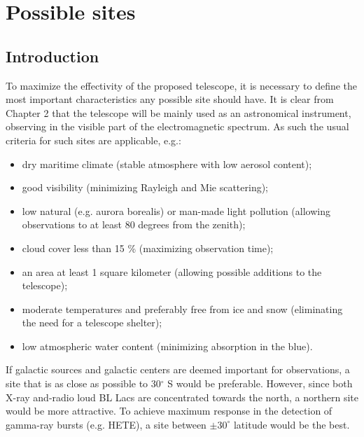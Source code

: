\chapter{Possible sites}


\section{Introduction}

\par\medskip
To maximize the effectivity of the proposed telescope, it is
necessary to define the most important characteristics any possible site
should have. It is clear from Chapter 2 that the telescope will be mainly
used as an astronomical instrument, observing in the visible part of the
electromagnetic spectrum. As such the usual criteria for such sites are
applicable, e.g.:

\begin{itemize}
\item  dry maritime climate (stable atmosphere with low aerosol content);

\item  good visibility (minimizing Rayleigh and Mie scattering);

\item  low natural (e.g. aurora borealis) or man-made light pollution
(allowing observations to at least 80 degrees from the zenith);

\item  cloud cover less than 15 \% (maximizing observation time);

\item  an area at least 1 square kilometer (allowing possible additions to
the telescope);

\item  moderate temperatures and preferably free from ice and snow
(eliminating the need for a telescope shelter);

\item  low atmospheric water content (minimizing absorption in the blue).
\end{itemize}

If galactic sources and galactic centers are deemed important for
observations, a site that is as close as possible to 30$^\circ$ S would be
preferable. However, since both X-ray and-radio loud BL Lacs are
concentrated towards the north, a northern site would be more attractive. To
achieve maximum response in the detection of gamma-ray bursts (e.g. HETE), a
site between $\pm 30^\circ$ latitude would be the best.

